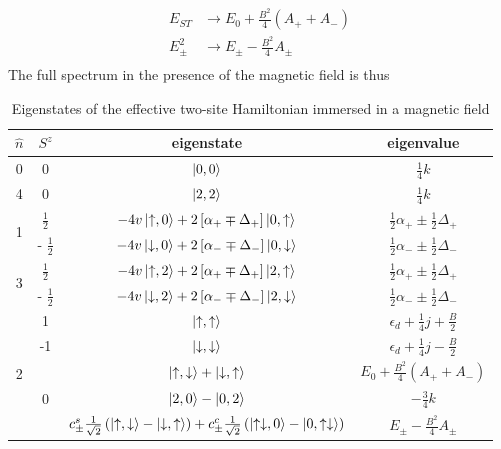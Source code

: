 \documentclass[12pt,twoside]{report}
\numberwithin{equation}{section}
\begin{document}
{\begin{equation}
\begin{aligned}
	E_{ST} &\to E_0 + \frac{B^2}{4}\left(A_+ + A_-\right)\\
	E^2_\pm &\to E_\pm - \frac{B^2}{4} A_\pm\\
\end{aligned}\end{equation}
The full spectrum in the presence of the magnetic field is thus
\pb \begin{table}[htpb]
	\centering
	\begin{tabular}{|c|c|c|c|}
		\hline
		\(\hat n\) & \(S^z\) & eigenstate & eigenvalue\\
		\hline
		0 & 0 & \(\ket{0,0}\) & \(\frac{1}{4}k\)\\
		4 & 0 & \(\ket{2,2}\) & \(\frac{1}{4}k\)\\
		\multirow{2}{*}{1} & \(\frac{1}{2}\) & \(-4v\ket{\uparrow,0} +2 \left[ \alpha_+ \mp \Delta_+\right] \ket{0, \uparrow}\) & \(\frac{1}{2} \alpha_+\pm \frac{1}{2}\Delta_+\)\\
		 & - \(\frac{1}{2}\) & \(-4v\ket{\downarrow,0} + 2 \left[ \alpha_- \mp \Delta_-\right] \ket{0, \downarrow}\)  &\(\frac{1}{2} \alpha_-\pm \frac{1}{2}\Delta_-\)\\
		\multirow{2}{*}{3} & \(\frac{1}{2}\) & \(-4v\ket{\uparrow,2} +2 \left[ \alpha_+\mp \Delta_+\right] \ket{2, \uparrow}\) &\(\frac{1}{2} \alpha_+\pm \frac{1}{2}\Delta_+\)\\
		 & - \(\frac{1}{2}\) & \(-4v\ket{\downarrow,2} +2 \left[ \alpha_- \mp \Delta_-\right] \ket{2, \downarrow}\)  &\(\frac{1}{2} \alpha_-\pm \frac{1}{2}\Delta_-\)\\
		\multirow{6}{*}{2} & 1 & \(\ket{\uparrow,\uparrow}\) & \(\epsilon_d + \frac{1}{4}j + \frac{B}{2}\)\\
		& -1 & \(\ket{\downarrow,\downarrow}\) & \(\epsilon_d + \frac{1}{4}j - \frac{B}{2}\)\\
		& \multirow{3}{*}{0} & \(\ket{\uparrow,\downarrow} + \ket{\downarrow, \uparrow}\) & \(E_0 + \frac{B^2}{4}\left(A_+ + A_-\right)\)\\
		& & \(\ket{2,0} - \ket{0,2}\) & \(-\frac{3}{4}k\)\\
		& & \(c_\pm^s \frac{1}{\sqrt 2}\left(\ket{\uparrow, \downarrow} - \ket{\downarrow, \uparrow}\right) + c^c_\pm \frac{1}{\sqrt 2}\left(\ket{\uparrow\downarrow, 0} - \ket{0, \uparrow\downarrow}\right)\) & \(E_\pm - \frac{B^2}{4} A_\pm\)\\
		\hline
	\end{tabular}
	\caption{Eigenstates of the effective two-site Hamiltonian immersed in a magnetic field}
\end{table}
}
\end{document}
